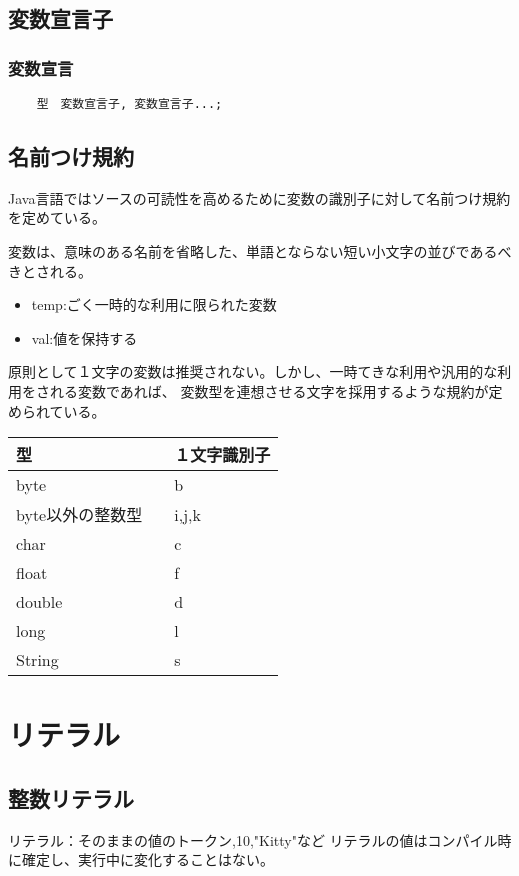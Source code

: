 \documentclass[12pt,a4j,twoside]{jsbook}
\begin{document}
\subsection{変数宣言子}
\subsubsection*{変数宣言}
\begin{lstlisting}
    型　変数宣言子, 変数宣言子...;
\end{lstlisting}
\subsection{名前つけ規約}
Java言語ではソースの可読性を高めるために変数の識別子に対して名前つけ規約を定めている。

変数は、意味のある名前を省略した、単語とならない短い小文字の並びであるべきとされる。
    \begin{itemize}
        \item temp:ごく一時的な利用に限られた変数
        \item val:値を保持する
    \end{itemize}
原則として１文字の変数は推奨されない。しかし、一時てきな利用や汎用的な利用をされる変数であれば、
変数型を連想させる文字を採用するような規約が定められている。
\begin{table}
    \begin{tabular}{|l|l|} \hline
        型　& １文字識別子\\ \hline
        byte & b \\
        byte以外の整数型　& i,j,k \\
        char & c\\
        float & f\\
        double & d \\
        long & l \\
        String & s \\ \hline
    \end{tabular} 
\end{table}
\section{リテラル}
\subsection{整数リテラル}
リテラル：そのままの値のトークン,10,"Kitty"など
リテラルの値はコンパイル時に確定し、実行中に変化することはない。
\end{document}
